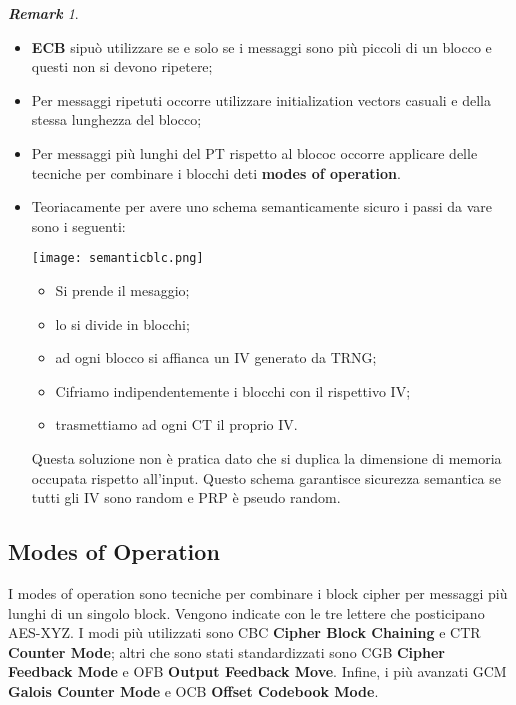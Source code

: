 \documentclass{article}
\theoremstyle{remark}
\newtheorem*{remark}{\textbf{Remark}}
\begin{document}
\begin{remark}
\begin{itemize}
    \item \textbf{ECB} sipuò utilizzare se e solo se i messaggi sono più piccoli di un blocco e questi non si devono ripetere;
    \item Per messaggi ripetuti occorre utilizzare initialization vectors casuali e della stessa lunghezza del blocco;
    \item Per messaggi più lunghi del PT rispetto al blococ occorre applicare delle tecniche per combinare i blocchi deti \textbf{modes of operation}.
    \item Teoriacamente per avere uno schema semanticamente sicuro i passi da vare sono i seguenti:
    \begin{center}
        \texttt{[image: semanticblc.png]}
    \end{center}
    \begin{itemize}
        \item Si prende il mesaggio;
        \item lo si divide in blocchi;
        \item ad ogni blocco si affianca un IV generato da TRNG;
        \item Cifriamo indipendentemente i blocchi con il rispettivo IV;
        \item trasmettiamo ad ogni CT il proprio IV.
    \end{itemize}
    Questa soluzione non è pratica dato che si duplica la dimensione di memoria occupata rispetto all'input. Questo schema garantisce sicurezza semantica se tutti gli IV sono random e PRP è pseudo random.
\end{itemize}
\end{remark}
\subsection{Modes of Operation}
I modes of operation sono tecniche per combinare i block cipher per messaggi più lunghi di un singolo block. Vengono indicate con le tre lettere che posticipano AES-XYZ.\newline
I modi più utilizzati sono CBC \textbf{Cipher Block Chaining} e CTR \textbf{Counter Mode}; altri che sono stati standardizzati sono CGB \textbf{Cipher Feedback Mode} e OFB \textbf{Output Feedback Move}. Infine, i più avanzati GCM \textbf{Galois Counter Mode} e OCB \textbf{Offset Codebook Mode}.
\end{document}
